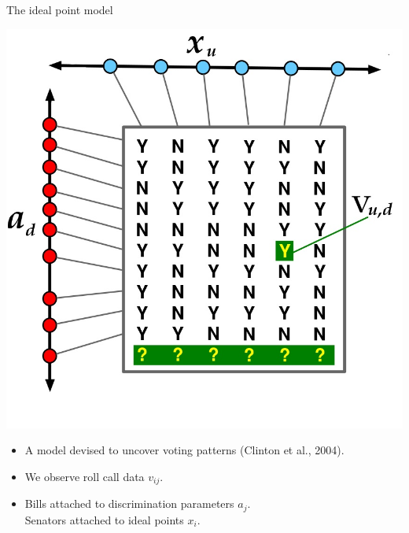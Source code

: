 \documentclass{beamer}
\begin{document}
\begin{frame}{The ideal point model}
  \begin{center}
    \includegraphics[scale=0.6]{figs/ideal-point-intuition.jpg}
  \end{center}
  \begin{itemize}
  \item A model devised to uncover voting patterns (Clinton et al., 2004).
  \item We observe roll call data $v_{ij}$.
  \item Bills attached to discrimination parameters $a_j$.\\
    Senators attached to ideal points $x_i$.
  \end{itemize}
\end{frame}

\end{document}
